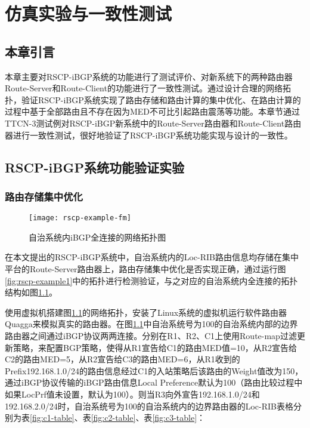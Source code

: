 \chapter{仿真实验与一致性测试}
\label{cha:evaluate}


\section{本章引言}
本章主要对RSCP-iBGP系统的功能进行了测试评价、对新系统下的两种路由器Route-Server和Route-Client的功能进行了一致性测试。通过设计合理的网络拓扑，验证RSCP-iBGP系统实现了路由存储和路由计算的集中优化、在路由计算的过程中基于全部路由且不存在因为MED不可比引起路由震荡等功能。本章节通过TTCN-3测试例对RSCP-iBGP新系统中的Route-Server路由器和Route-Client路由器进行一致性测试，很好地验证了RSCP-iBGP系统功能实现与设计的一致性。

\section{RSCP-iBGP系统功能验证实验}

\subsection{路由存储集中优化}


\begin{figure}
  \centering
  \texttt{[image: rscp-example-fm]}
  \caption{自治系统内iBGP全连接的网络拓扑图}
  \label{fig:rscp-example-fm}
\end{figure}

在本文提出的RSCP-iBGP系统中，自治系统内的Loc-RIB路由信息均存储在集中平台的Route-Server路由器上，路由存储集中优化是否实现正确，通过运行图\ref{fig:rscp-example1}中的拓扑进行检测验证，与之对应的自治系统内全连接的拓扑结构如图\ref{fig:rscp-example-fm}。

使用虚拟机搭建图\ref{fig:rscp-example-fm}的网络拓扑，安装了Linux系统的虚拟机运行软件路由器Quagga来模拟真实的路由器。在图\ref{fig:rscp-example-fm}中自治系统号为100的自治系统内部的边界路由器之间通过iBGP协议两两连接。分别在R1、R2、C1上使用Route-map过滤更新策略，来配置BGP策略，使得从R1宣告给C1的路由MED值=10，从R2宣告给C2的路由MED=5，从R2宣告给C3的路由MED=6，从R1收到的Prefix192.168.1.0/24的路由信息经过C1的入站策略后该路由的Weight值改为150，通过iBGP协议传输的iBGP路由信息Local Preference默认为100（路由比较过程中如果LocPrf值未设置，默认为100）。则当R3向外宣告192.168.1.0/24和192.168.2.0/24时，自治系统号为100的自治系统内的边界路由器的Loc-RIB表格分别为表\ref{fig:c1-table}、表\ref{fig:c2-table}、表\ref{fig:c3-table}：

